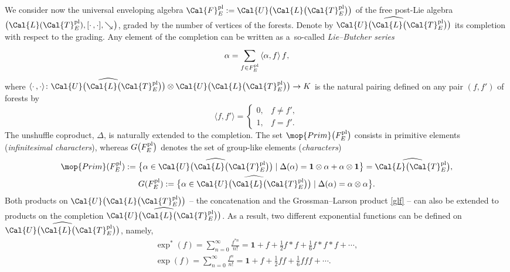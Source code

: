 \documentclass[10pt,a4paper]{amsart}
\numberwithin{equation}{section}
\begin{document}
We consider now the universal enveloping algebra $\Cal{F}^{\rm pl}_E := \Cal{U}\big(\Cal{L}\big(\Cal{T}^{\rm pl}_E\big)\big)$ of the free post-Lie algebra $\big(\Cal{L}(\Cal{T}^{\rm pl}_E), [\cdot\,,\cdot ], \searrow\! \big)$, graded by the number of vertices of the forests. Denote by $\widehat{\Cal{U}\big(\Cal{L}\big(\Cal{T}^{\rm pl}_E\big)\big)}$ its completion with respect to the grading. Any element of the completion can be written as a~so-called \textit{Lie--Butcher series} \cite{ELM2015,HA13,MKW08}
\begin{equation*}
\alpha = \sum_{f \in F^{\rm pl}_E}^{}{\left\langle \alpha, f \right\rangle f},
\end{equation*}
where $\left\langle \cdot\, , \cdot \right\rangle\! \colon \widehat{\Cal{U}\big(\Cal{L}\big(\Cal{T}^{\rm pl}_E\big)\big)} \otimes \Cal{U}\big(\Cal{L}\big(\Cal{T}^{\rm pl}_E\big)\big) \rightarrow K$ is the natural pairing defined on any pair $(f,f')$ of forests by
\begin{equation*}
\langle f , f' \rangle =
\begin{cases}
0,& f \neq f', \\ 1,& f = f'.
\end{cases}
\end{equation*}
The unshuffle coproduct, $\Delta$, is naturally extended to the completion. The set $\mop{Prim}\big(F^{\rm pl}_E\big)$ consists in primitive elements (\textit{infinitesimal characters}), whereas $G\big(F^{\rm pl}_E\big)$ denotes the set of group-like elements (\textit{characters})
\begin{gather*}
\mop{Prim}(F^{\rm pl}_E) := \big\{\alpha \in \widehat{\Cal{U}\big(\Cal{L}\big(\Cal{T}^{\rm pl}_E\big)\big)}\mid
\Delta(\alpha)
= \mathbf{1} \otimes \alpha + \alpha \otimes \mathbf{1}\big\}=\widehat{\Cal{L}\big(\Cal{T}^{\rm pl}_E\big)},
\\
G(F^{\rm pl}_E) := \big\{\alpha \in \widehat{\Cal{U}\big(\Cal{L}\big(\Cal{T}^{\rm pl}_E\big)\big)}\mid \Delta(\alpha)
= \alpha \otimes \alpha \big\}.
\end{gather*}
Both products on $\Cal{U}\big(\Cal{L}\big(\Cal{T}^{\rm pl}_E\big)\big)$ -- the concatenation and the Grossman--Larson product \eqref{glf} -- can also be extended to products on the completion $\widehat{\Cal{U}\big(\Cal{L}\big(\Cal{T}^{\rm pl}_E\big)\big)}$. As a result, two different exponential functions can be defined on $\widehat{\Cal{U}\big(\Cal{L}\big(\Cal{T}^{\rm pl}_E\big)\big)}$, namely,
\begin{gather*}
\exp^{*}(f) = \sum_{n=0}^{\infty}{\frac{f^{*n}}{n!}}
= \mathbf{1} + f + \frac{1}{2} f \ast f + \frac{1}{6} f \ast f \ast f + \cdots,
\\
\exp(f) = \sum_{n=0}^{\infty}{\frac{f^{n}}{n!}}
= \mathbf{1} + f + \frac{1}{2} f f + \frac{1}{6} f f f + \cdots.
\end{gather*}
\end{document}
